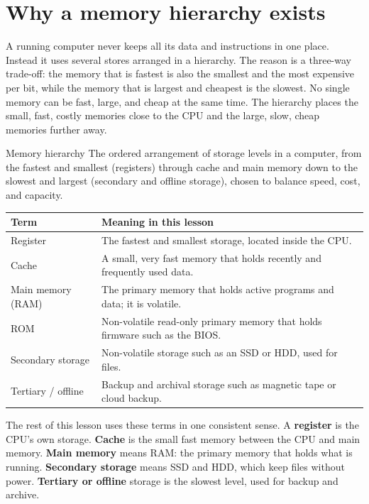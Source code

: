 \section{Why a memory hierarchy exists}
A running computer never keeps all its data and instructions in one place.
Instead it uses several stores arranged in a hierarchy. The reason is a
three-way trade-off: the memory that is fastest is also the smallest and the
most expensive per bit, while the memory that is largest and cheapest is the
slowest. No single memory can be fast, large, and cheap at the same time.
The hierarchy places the small, fast, costly memories close to the CPU and
the large, slow, cheap memories further away.

\begin{definitionbox}{Memory hierarchy}
The ordered arrangement of storage levels in a computer, from the fastest
and smallest (registers) through cache and main memory down to the slowest
and largest (secondary and offline storage), chosen to balance speed, cost,
and capacity.
\end{definitionbox}

\begin{center}
\begin{tabular}{p{}p{}}
\toprule
\textbf{Term} & \textbf{Meaning in this lesson} \\
\midrule
Register & The fastest and smallest storage, located inside the CPU. \\
Cache & A small, very fast memory that holds recently and frequently used data. \\
Main memory (RAM) & The primary memory that holds active programs and data; it is volatile. \\
ROM & Non-volatile read-only primary memory that holds firmware such as the BIOS. \\
Secondary storage & Non-volatile storage such as an SSD or HDD, used for files. \\
Tertiary / offline & Backup and archival storage such as magnetic tape or cloud backup. \\
\bottomrule
\end{tabular}
\end{center}

The rest of this lesson uses these terms in one consistent sense. A
\textbf{register} is the CPU's own storage. \textbf{Cache} is the small fast
memory between the CPU and main memory. \textbf{Main memory} means RAM: the
primary memory that holds what is running. \textbf{Secondary storage} means
SSD and HDD, which keep files without power. \textbf{Tertiary or offline}
storage is the slowest level, used for backup and archive.


